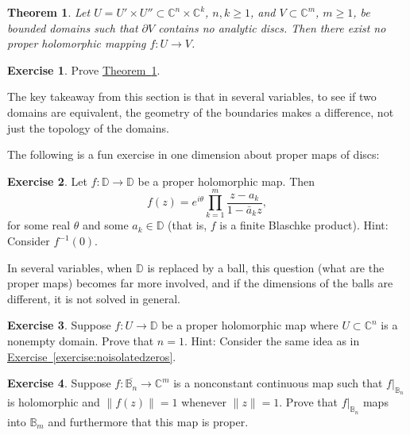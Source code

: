 \documentclass[12pt,openany]{book}
\newcommand{\snorm}[1]{\lVert {#1} \rVert}
\newcommand{\C}{{\mathbb{C}}}
\newcommand{\D}{{\mathbb{D}}}
\newcommand{\bB}{{\mathbb{B}}}
\theoremstyle{plain}
\newtheorem{thm}{Theorem}[section]
\theoremstyle{remark}
\theoremstyle{definition}
\newenvironment{exbox}{%
    \def\FrameCommand{\vrule width 1pt \relax\hspace{10pt}}%
    \MakeFramed{\advance\hsize-\width\FrameRestore}%
}{%
    \endMakeFramed
}
\theoremstyle{exercise}
\newtheorem{exercise}{Exercise}[section]
\theoremstyle{example}
\newcommand{\exerciseref}[1]{\hyperref[#1]{Exercise~\ref*{#1}}}
\newcommand{\thmref}[1]{\hyperref[#1]{Theorem~\ref*{#1}}}
\begin{document}
\begin{thm} \label{thm:nopropmapprodandnodisc}
Let $U = U' \times U'' \subset \C^n \times \C^k$, $n,k \geq 1$, and $V
\subset \C^m$, $m \geq 1$, be bounded
domains such that $\partial V$ contains no analytic discs.
Then there exist no proper
holomorphic mapping $f \colon U \to V$.
\end{thm}

\begin{exbox}
\begin{exercise}
Prove \thmref{thm:nopropmapprodandnodisc}.
\end{exercise}
\end{exbox}

The key takeaway from this section is that
in several variables, to see if two domains are equivalent,
the geometry 
of the boundaries makes a difference, not just the topology
of the domains.

\medskip

The following is a fun exercise in one dimension about proper maps of discs:

\begin{exbox}
\begin{exercise}
Let $f \colon \D \to \D$ be a proper holomorphic  map.  Then
\begin{equation*}
f(z) = 
e^{i\theta} \prod_{k=1}^m \frac{z-a_k}{1-\bar{a}_k z} ,
\end{equation*}
for some real $\theta$ and some $a_k \in \D$ (that is, $f$ is a finite
Blaschke product).  Hint: Consider $f^{-1}(0)$.
\end{exercise}
\end{exbox}

In several variables, when $\D$ is replaced by a ball,
this question (what are the proper maps)
becomes far more involved, and if the dimensions of the balls are
different, it is not solved in general.

\begin{exbox}
\begin{exercise}
Suppose $f \colon U \to \D$ be a proper holomorphic map where $U \subset
\C^n$ is a nonempty domain.  Prove that $n=1$.  Hint: Consider the same idea as in
\exerciseref{exercise:noisolatedzeros}.
\end{exercise}

\begin{exercise}
Suppose $f \colon \overline{\bB_n} \to \C^m$ is a nonconstant continuous
map such that $f|_{\bB_n}$ is holomorphic and $\snorm{f(z)} = 1$ whenever
$\snorm{z}=1$.  Prove that 
$f|_{\bB_n}$ maps into $\bB_m$ and furthermore that this map is proper.
\end{exercise}
\end{exbox}
\end{document}
